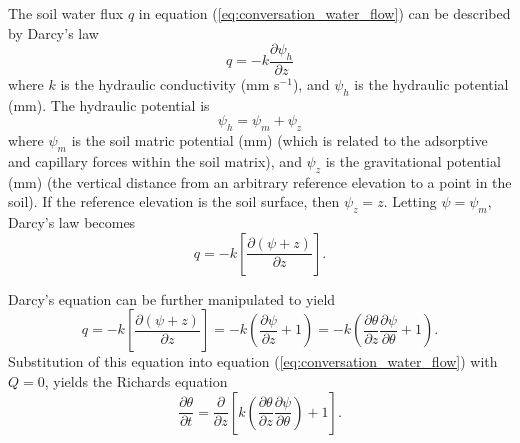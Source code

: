 \documentclass[12pt,authoryear]{elsarticle}
\numberwithin{equation}{section} %
\begin{document}
The soil water flux $q$ in equation (\ref{eq:conversation_water_flow}) can be described by Darcy’s law
\begin{equation}
q = -k \frac{\partial \psi_{h}}{\partial z}
\end{equation}
where $k$ is the hydraulic conductivity (mm s$^{-1}$), and $\psi_{h}$ is the hydraulic potential (mm). The hydraulic potential is 
\begin{equation}
\psi_{h} = \psi_{m}+\psi_{z}
\end{equation}
where $\psi_{m}$ is the soil matric potential (mm) (which is related to the adsorptive and capillary forces within the soil matrix), and $\psi_{z}$ is the gravitational potential (mm) (the
vertical distance from an arbitrary reference elevation to a point in the soil). If the reference elevation is the soil surface, then $\psi_{z}=z$. Letting $\psi=\psi_{m}$, Darcy’s law
becomes
\begin{equation}
\label{eq:darcy's_law}
q=-k\left[\frac{\partial (\psi+z)}{\partial z}\right].
\end{equation}

Darcy’s equation can be further manipulated to yield
\begin{equation}
q=-k\left[\frac{\partial (\psi+z)}{\partial z}\right]=-k\left(\frac{\partial \psi}{\partial z}+1\right)=-k\left(\frac{\partial \theta}{\partial z} \frac{\partial \psi}{\partial \theta}+1\right).
\end{equation}
Substitution of this equation into equation (\ref{eq:conversation_water_flow}) with $Q=$0, yields the Richards
equation
\begin{equation}
\label{eq:richards_equation}
\frac{\partial \theta}{\partial t}=\frac{\partial}{\partial z}\left[k\left(\frac{\partial \theta}{\partial z}\frac{\partial \psi}{\partial \theta}\right)+1\right].
\end{equation}
\end{document}
